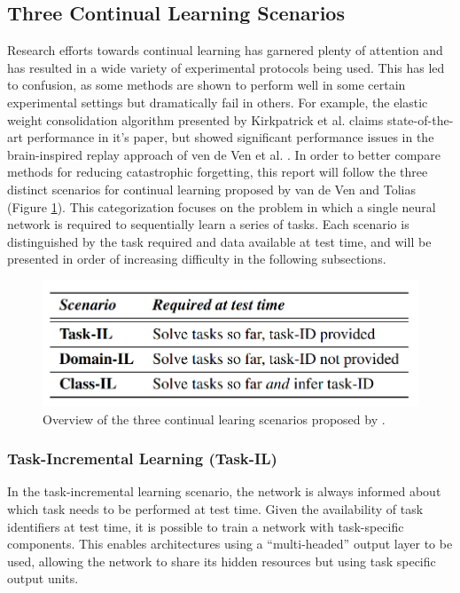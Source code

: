 \documentclass{article}
\begin{document}
\subsection{Three Continual Learning Scenarios} \label{three_CL_scenarios}
Research efforts towards continual learning has garnered plenty of attention and has resulted in a wide variety of experimental protocols being used. This has led to confusion, as some methods are shown to perform well in some certain experimental settings but dramatically fail in others. For example, the elastic weight consolidation algorithm presented by Kirkpatrick et al. \cite{kirkpatrick2017overcoming} claims state-of-the-art performance in it’s paper, but showed significant performance issues in the brain-inspired replay approach of ven de Ven et al. \cite{van2020brain}. In order to better compare methods for reducing catastrophic forgetting, this report will follow the three distinct scenarios for continual learning proposed by van de Ven and Tolias \cite{van2019three} (Figure \ref{fig:three_CL_scenarios}). This categorization focuses on the problem in which a single neural network is required to sequentially learn a series of tasks. Each scenario is distinguished by the task required and data available at test time, and will be presented in order of increasing difficulty in the following subsections.

\begin{figure}[h]
	\centering
    \includegraphics[width=0.60\linewidth]{three_CL_scenarios}
    \caption{Overview of the three continual learing scenarios proposed by \cite{van2019three}.}
	\label{fig:three_CL_scenarios}
\end{figure}

\subsubsection{Task-Incremental Learning (Task-IL)}
In the task-incremental learning scenario, the network is always informed about which task needs to be performed at test time. Given the availability of task identifiers at test time, it is possible to train a network with task-specific components. This enables architectures using a “multi-headed” output layer to be used, allowing the network to share its hidden resources but using task specific output units. 
\end{document}
